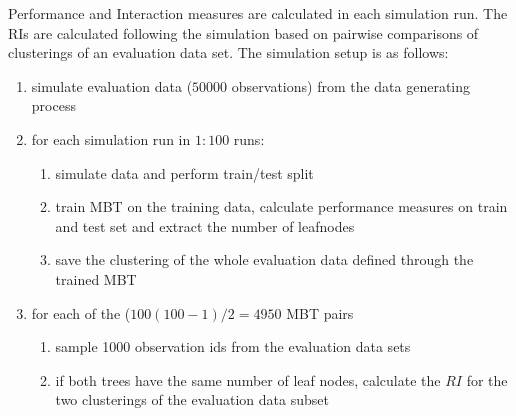 Performance and Interaction measures are calculated in each simulation run.  
The RIs are calculated following the simulation based on pairwise comparisons of clusterings of an evaluation data set. The simulation setup is as follows:

\begin{enumerate}
    \item simulate evaluation data ($50000$ observations) from the data generating process
    \item for each simulation run in $1:100$ runs:
    \begin{enumerate}
        \item simulate data and perform train/test split
        \item train MBT on the training data, calculate performance measures on train and test set and extract the number of leafnodes
        \item save the clustering of the whole evaluation data defined through the trained MBT
    \end{enumerate}
    \item for each of the ($100(100-1)/2 = 4950$ MBT pairs
    \begin{enumerate}
        \item sample 1000 observation ids from the evaluation data sets
        \item if both trees have the same number of leaf nodes, calculate the $RI$ for the two clusterings of the evaluation data subset
    \end{enumerate}
\end{enumerate}


